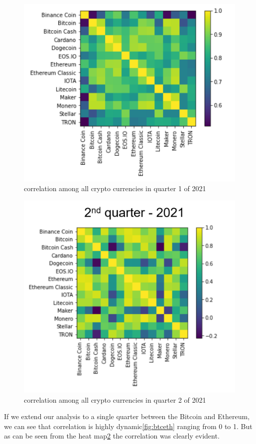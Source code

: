 \documentclass[final]{cvpr}
\begin{document}
\begin{figure}[h!]
\begin{center}
\caption{correlation among all crypto currencies in quarter 1 of 2021}
\includegraphics[width=0.8\linewidth]{latex/cor1.png}
\end{center}
\label{fig:all1}
\end{figure}

\begin{figure}[h!]
\begin{center}
\caption{correlation among all crypto currencies in quarter 2 of 2021}
\includegraphics[width=0.8\linewidth]{latex/cor2.png}
\end{center}
\label{fig:all2}
\end{figure}

If we extend our analysis to a single quarter between the Bitcoin and Ethereum, we can see that correlation is highly dynamic\ref{fig:btceth} ranging from 0 to 1. But as can be seen from the heat map\ref{fig:all2} the correlation was clearly evident. 
\end{document}
